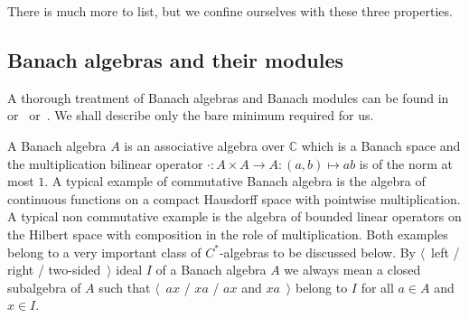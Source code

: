 There is much more to list, but we confine ourselves with these three
properties.


\subsection{
  Banach algebras and their modules
}\label{SubSectionBanachAlgebrasAndTheirModules}

A thorough treatment of Banach algebras and Banach modules can be found
in~\cite{HelBanLocConvAlg} or~\cite{HelHomolBanTopAlg}
or~\cite{DalBanAlgAutCont}. We shall describe only the bare minimum required for
us.

A Banach algebra $A$ is an associative algebra over $\mathbb{C}$ which is a
Banach space and the multiplication bilinear operator 
$\cdot:A\times A\to A:(a,b)\mapsto ab$ is of the norm at most $1$. A typical
example of commutative Banach algebra is the algebra of continuous functions on
a compact Hausdorff space with pointwise multiplication. A typical non
commutative example is the algebra of bounded linear operators on the Hilbert
space with composition in the role of multiplication. Both examples belong to a
very important class of $C^*$-algebras to be discussed below. By $\langle$~left
/ right / two-sided~$\rangle$ ideal $I$ of a Banach algebra $A$ we always mean a
closed subalgebra of $A$ such that $\langle$~$ax$ / $xa$ / $ax$ and
$xa$~$\rangle$ belong to $I$ for all $a\in A$ and $x\in I$.

